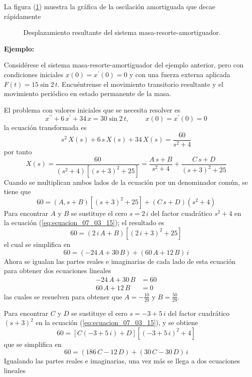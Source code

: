 La figura (\ref{fig:figura_009}) muestra la gráfica de la oscilación amortiguada que decae rápidamente
\begin{figure}[H]
    \centering
    
    \caption{Desplazamiento resultante del sistema masa-resorte-amortiguador.}
    \label{fig:figura_009}
\end{figure}
\textbf{Ejemplo:}
\par
Considérese el sistema masa-resorte-amortiguador del ejemplo anterior, pero con condiciones iniciales $x(0) = x^{\prime}(0) = 0$ y con una fuerza externa aplicada $F(t) = 15 \sin 2 \, t$. Encuéntrense el movimiento transitorio resultante y el movimiento periódico en estado permanente de la masa.
\par
El problema con valores iniciales que se necesita resolver es
\[ x^{\prime \prime} + 6 \, x^{\prime} + 34 \, x =  30  \sin 2 \, t, \hspace{1cm} x(0) = x^{\prime}(0) = 0 \]
la ecuación transformada es
\[ s^{2} \, X(s) + 6 \, s \, X(s) + 34 \, X(s) = \dfrac{60}{s^{2} + 4} \]
por tanto
\[ X(s) = \dfrac{60}{(s^{2} + 4)[(s+3)^{2} + 25]} = \dfrac{A \, s + B}{s^{2} + 4} + \dfrac{C \, s + D}{(s+3)^{2} + 25} \]
Cuando se multiplican ambos lados de la ecuación por un denominador común, se tiene que
\begin{equation}
60 = (A , s + B) [(s+3)^{2} + 25] + (C \, s + D)(s^{2} + 4)
\label{eq:ecuacion_07_03_15}
\end{equation}
Para encontrar $A$ y $B$ se sustituye el cero $s = 2 \, i$ del factor cuadrático $s^{2} + 4$ en la ecuación (\ref{eq:ecuacion_07_03_15}); el resultado es
\[ 60 = (2 \, i \, A + B)[(2 \, i + 3)^{2} + 25] \]
el cual se simplifica en
\[ 60 = (-24 \, A + 30 \, B) + (60 \, A + 12 \, B) \, i \]
Ahora se igualan las partes reales e imaginarias de cada lado de esta ecuación para obtener dos ecuaciones lineales
\begin{align*}
-24 \, A + 30 \, B &= 60 \\
60 \, A + 12 \, B &= 0
\end{align*}
las cuales se resuelven para obtener que $A = - \frac{10}{29}$ y $B = \frac{50}{29}$.
\par
Para encontrar $C$ y $D$ se sustituye el cero $s=-3 + 5 \, i$ del factor cuadrático $(s+3)^{2}$ en la ecuación (\ref{eq:ecuacion_07_03_15}), y se obtiene
\[ 60 = [C (-3 +  5 \, i) + D][(-3 + 5 \, i)^{2} + 4] \]
que se simplifica en
\[ 60 = (186 \, C -12 \, D) + (30 \, C - 30 \, D) \, i \]
Igualando las partes reales e imaginarias, una vez más se llega a dos ecuaciones lineales
